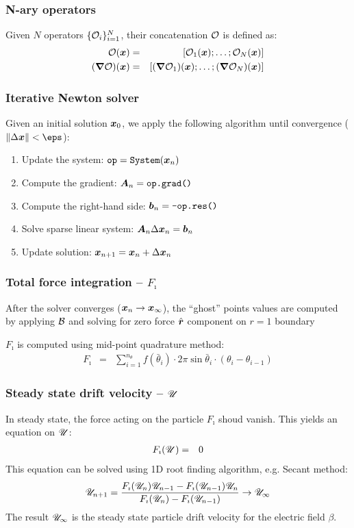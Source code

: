 \subsubsection{N-ary operators}
Given $N$ operators $\{\mathcal{O}_i\}_{i=1}^N$, their concatenation $\mathcal{O}$ is defined as:
\begin{eqnarray}
\mathcal{O}(\boldsymbol{x}) &=& [\mathcal{O}_1(\boldsymbol{x}); \ldots; \mathcal{O}_N(\boldsymbol{x})] \\
(\boldsymbol{\nabla}\mathcal{O})(\boldsymbol{x}) &=& [(\boldsymbol{\nabla}\mathcal{O}_1)(\boldsymbol{x}); \ldots; (\boldsymbol{\nabla}\mathcal{O}_N)(\boldsymbol{x})]
\end{eqnarray}

\subsubsection{Iterative Newton solver}
Given an initial solution $\boldsymbol{x}_0$, we apply the following algorithm 
until convergence ($\|\Delta \bx\| < \eps$):
\begin{enumerate}
\item Update the system: $\verb|op| = \verb|System|(\bx_{n})$
\item Compute the gradient: $\boldsymbol{A}_n = \verb|op.grad()|$
\item Compute the right-hand side: $\boldsymbol{b}_n = \verb|-op.res()|$
\item Solve sparse linear system: $\boldsymbol{A}_n \Delta \boldsymbol{x}_n = \boldsymbol{b}_n$
\item Update solution: $\boldsymbol{x}_{n+1} = \boldsymbol{x}_{n} + \Delta \boldsymbol{x}_{n}$
\end{enumerate}

\subsubsection{Total force integration -- $F_\imath$}
After the solver converges ($\boldsymbol{x}_n \rightarrow \boldsymbol{x}_\infty$), 
the ``ghost'' points values are computed by applying $\mathcal{B}$ and
solving for zero force  $\hat{\boldsymbol{r}}$ component on $r=1$ boundary

$F_\imath$ is computed using mid-point quadrature method:
\begin{eqnarray}
F_\imath &=& \sum_{i=1}^{n_\theta} f(\bar\theta_i) \cdot 
              2 \pi \sin\bar\theta_i \cdot (\theta_i - \theta_{i-1})
\end{eqnarray}

\subsubsection{Steady state drift velocity -- $\mathscr{U}$}
In steady state, the force acting on the particle $F_\imath$ shoud vanish.
This yields an equation on $\mathscr{U}$:
\begin{eqnarray}
F_\imath(\mathscr{U}) &=& 0
\end{eqnarray}
This equation can be solved using 1D root finding algorithm, e.g. Secant method:
\begin{eqnarray}
\mathscr{U}_{n+1} = \frac{F_\imath(\mathscr{U}_{n})\mathscr{U}_{n-1} - F_\imath(\mathscr{U}_{n-1})\mathscr{U}_{n}}
{F_\imath(\mathscr{U}_{n}) - F_\imath(\mathscr{U}_{n-1})} \rightarrow \mathscr{U}_\infty
\end{eqnarray}
The result $\mathscr{U}_\infty$ is the 
steady state particle drift velocity for the electric field $\beta$.

